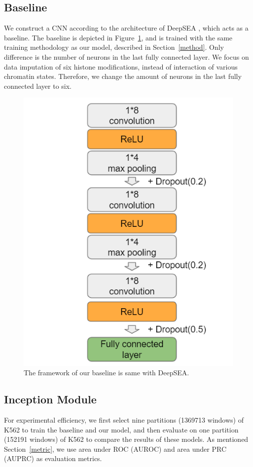 \subsection{Baseline}
We construct a CNN according to the architecture of DeepSEA \cite{zhou2015predicting}, which acts as a baseline. The baseline is depicted in Figure~\ref{f16}, and is trained with the same training methodology as our model, described in Section~\ref{method}. Only difference is the number of neurons in the last fully connected layer. We focus on data imputation of six histone modifications, instead of interaction of various chromatin states. Therefore, we change the amount of neurons in the last fully connected layer to six.

\begin{figure}[H]
    \centering
    \includegraphics[width=0.6\columnwidth]{body/figure/figure16.png}
    \captionsetup{labelfont=bf}
    \renewcommand{\baselinestretch}{1.0}
    \caption[Framework of baseline]{The framework of our baseline is same with DeepSEA.}
    \label{f16}
\end{figure}

\subsection{Inception Module}
For experimental efficiency, we first select nine partitions (1369713 windows) of K562 to train the baseline and our model, and then evaluate on one partition (152191 windows) of K562 to compare the results of these models.  As mentioned Section~\ref{metric}, we use area under ROC (AUROC) and area under PRC (AUPRC) as evaluation metrics.

